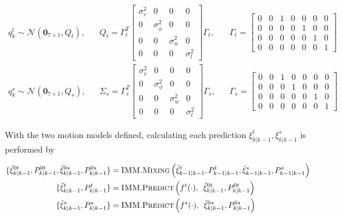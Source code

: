 \begin{align}
        q_{k}^{t}
        \sim \mathcal{N}\left(\mathbf{0}_{7\times1}, Q_{t}\right), 
    &&   
        Q_{t} = \Gamma_t^T
        \begin{bmatrix}
            \sigma_v^2 & 0 & 0 & 0 \\ 
            0 & \sigma_{\dot{\phi}}^2 & 0 & 0 \\
            0 & 0 & \sigma_w^2 & 0 \\
            0 & 0 & 0 & \sigma_l^2
        \end{bmatrix}
        \Gamma_t,
    &&
        \Gamma_t = 
            \begin{bmatrix}
                0 & 0 & 1 & 0 & 0 & 0 & 0 \\
                0 & 0 & 0 & 0 & 1 & 0 & 0 \\
                0 & 0 & 0 & 0 & 0 & 1 & 0 \\
                0 & 0 & 0 & 0 & 0 & 0 & 1
            \end{bmatrix}
        \\  
        q_{k}^{s}
        \sim \mathcal{N}\left(\mathbf{0}_{7\times1}, Q_{s}\right), 
    &&   
        \Sigma_s = \Gamma_s^T
        \begin{bmatrix}
            \sigma_v^2 & 0 & 0 & 0 \\
            0 & \sigma_{\phi}^2 & 0 & 0 \\
            0 & 0 & \sigma_w^2 & 0 \\
            0 & 0 & 0 & \sigma_l^2 
        \end{bmatrix}
        \Gamma_s,
    && 
        \Gamma_s = 
            \begin{bmatrix}
                0 & 0 & 1 & 0 & 0 & 0 & 0 \\
                0 & 0 & 0 & 1 & 0 & 0 & 0 \\
                0 & 0 & 0 & 0 & 0 & 1 & 0 \\
                0 & 0 & 0 & 0 & 0 & 0 & 1
            \end{bmatrix}
\end{align}

With the two motion models defined, calculating each prediction $\xi_{k|k-1}^t, \xi_{k|k-1}^s$ is performed by

\begin{equation}
    \begin{split}
    \{\hat{\xi}^{0t}_{k|k-1}, P_{k|k-1}^{0t}, \hat{\xi}^{0s}_{k|k-1}, P_{k|k-1}^{0s}\} &= \textsc{IMM.Mixing}\left(\hat{\xi}^{t}_{k-1|k-1}, P^{t}_{k-1|k-1},\hat{\xi}^{s}_{k-1|k-1}, P^{s}_{k-1|k-1}\right)
    \\
        \{\hat{\xi}^t_{k|k-1}, P_{k|k-1}^t\} &= \textsc{IMM}.\textsc{Predict}\left(f^t(\cdot),\enskip \hat{\xi}^{0t}_{k|k-1}, P_{k|k-1}^{0t}\right)
    \\
        \{\hat{\xi}^s_{k|k-1}, P_{k|k-1}^s\} &= \textsc{IMM}.\textsc{Predict}\left(f^s(\cdot),\enskip \hat{\xi}^{0s}_{k|k-1}, P_{k|k-1}^{0s}\right)
    \end{split}
\end{equation}

